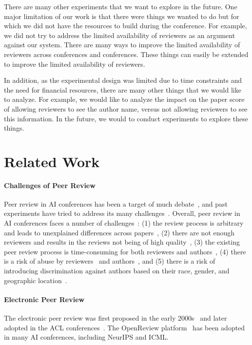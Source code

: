 \begin{minipage}[t]{\linewidth}
\label{sec:limitations}
There are many other experiments that we want to explore in the future. One major limitation of our work is that there were things we wanted to do but for which we did not have the resources to build during the conference. For example, we did not try to address the limited availability of reviewers as an argument against our system. There are many ways to improve the limited availability of reviewers across conferences and conferences. These things can easily be extended to improve the limited availability of reviewers. 

In addition, as the experimental design was limited due to time constraints and the need for financial resources, there are many other things that we would like to analyze. For example, we would like to analyze the impact on the paper score of allowing reviewers to see the author name, versus not allowing reviewers to see this information. In the future, we would to conduct experiments to explore these things. 


\section{Related Work}

\paragraph{Challenges of Peer Review}
Peer review in AI conferences has been a target of much debate~\citep{shah2022challenges,freyne2010relative,kim2019author}, and past experiments have tried to address its many challenges~\citep{beygelzimer2023has,cortes2021inconsistency}. Overall, peer review in AI conferences faces a number of challenges~\citep{beygelzimer2023has}: (1) the review process is arbitrary and leads to unexplained differences across papers~\citep{beygelzimer2023has,cortes2021inconsistency}, (2) there are not enough reviewers and results in the reviews not being of high quality~\citep{tran2020open}, (3) the existing peer review process is time-consuming for both reviewers and authors~\citep{stelmakh2021novice}, (4) there is a risk of abuse by reviewers~\citep{russo2021some,nicholson2016brief} and authors~\citep{wu2021making,jecmen2024detection}, and (5) there is a risk of introducing discrimination against authors based on their race, gender, and geographic location~\cite{hargittai2020potential}.
\paragraph{Electronic Peer Review}
The electronic peer review was first proposed in the early 2000s~\citep{bornmann2007we,facey2017educational,gibson2015digital,warne2016rewarding} and later adopted in the ACL conferences~\citep{nicholson2016brief,tran2020open}. The OpenReview platform~\citep{tran2020open} has been adopted in many AI conferences, including NeurIPS and ICML. 

\end{minipage}
